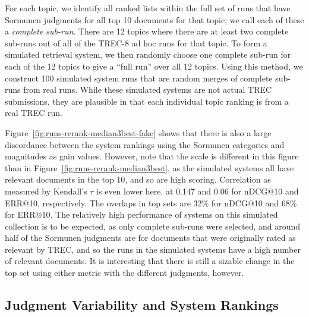 For each topic, we identify all ranked lists within the full
set of runs that have Sormunen judgments for all top 10 documents for
that topic; we call each of these a 
\emph{complete sub-run}.
There are 12 topics where there are at least two complete sub-runs out of
all of the TREC-8 ad hoc runs for that topic.
To form a simulated retrieval system, we then randomly choose one
complete sub-run for each of the 12 topics to
give a ``full run'' over all 12 topics.
Using this method, we construct 100 simulated system runs that are
random merges of complete sub-runs from real 
runs.
While these simulated systems are not actual TREC submissions, they are
plausible in that each individual topic ranking is from a real TREC
run.

Figure~\ref{fig:runs-rerank-median3best-fake} shows that there is also a
large discordance between the system rankings using the Sormunen
categories and magnitudes as gain values.
However, note that the scale is different in this figure than in
Figure~\ref{fig:runs-rerank-median3best}, as the simulated systems all have
relevant documents in the top 10, and so are high scoring.
Correlation as measured by Kendall's $\tau$ is even lower here, at 0.147
and 0.06 for nDCG@10 and ERR@10, respectively.
The overlaps in top sets are 32\% for nDCG@10 and 68\% for ERR@10.
The relatively high performance of systems on this simulated collection
is to be expected, as only complete sub-runs were selected, and around
half of the Sormunen judgments are for documents that were originally
rated as relevant by TREC, and so the runs in the simulated systems
have a high number of relevant documents.
It is interesting that there is still a sizable change in the top
set using either metric with the different judgments, however.

\subsection{Judgment Variability and System Rankings} 
\label{sec-judge}



